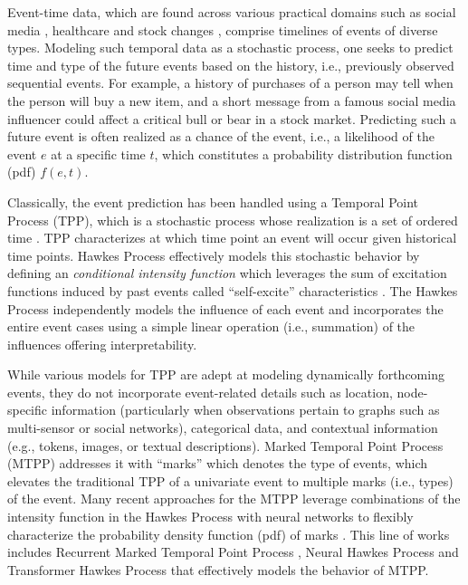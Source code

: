 Event-time data, which are found across various practical domains such as social media \cite{seismic, snapnets}, healthcare \cite{bib:RMTPP, meng2023dynamic} and stock changes \cite{Bacry2014MarketIA, hawkesInFinance}, 
comprise timelines of events of diverse types. 
Modeling such temporal data as a stochastic process, one seeks to predict time and type of the future events based on the history, i.e., previously observed sequential events. 
For example, a history of purchases of a person may tell when the person will buy a new item, and a short message from a famous social media influencer could affect a critical bull or bear in a stock market. %
Predicting such a future event is often realized as a chance of the event, i.e., a likelihood of the event $e$ at a specific time $t$, 
which constitutes a probability distribution function (pdf) $f(e,t)$. 

Classically, the event prediction has been handled using a Temporal Point Process (TPP), which is a stochastic process whose realization is a set of ordered time \cite{lec:tpp}. %
TPP characterizes at which time point an event will occur given historical time points. 
Hawkes Process effectively models this stochastic behavior by defining an \textit{conditional intensity function} which leverages the sum of excitation functions induced by past events called ``self-excite'' characteristics \cite{bib:hawkesOrigin,bib:hawkes}. 
The Hawkes Process independently models the influence of each event and incorporates the entire event cases using a simple linear operation (i.e., summation) of the influences offering interpretability. %

While various models for TPP are adept at modeling dynamically forthcoming events, 
they do not incorporate event-related details such as location, node-specific information (particularly when observations pertain to graphs such as multi-sensor or social networks), categorical data, and contextual information (e.g., tokens, images, or textual descriptions). 
Marked Temporal Point Process (MTPP) addresses it 
with ``marks'' which denotes the type of events, which elevates the traditional TPP of a univariate event to multiple marks (i.e., types) of the event. 
Many recent approaches for the MTPP leverage combinations of the intensity function in the Hawkes Process with neural networks 
to flexibly characterize the probability density function (pdf) of marks \cite{bib:nhp, bib:NJSDE, bib:sahp, bib:STPP, bib:ANHP}.
This line of works includes Recurrent Marked Temporal Point Process \cite{bib:RMTPP}, Neural Hawkes Process \cite{bib:nhp} and Transformer Hawkes Process \cite{bib:THP}
that effectively models the behavior of MTPP. 

